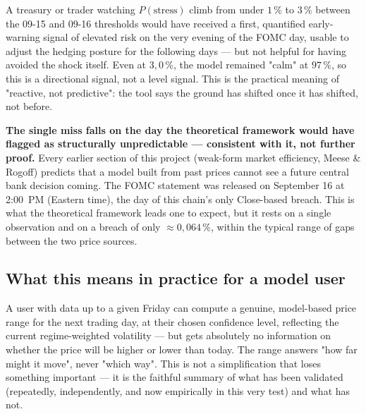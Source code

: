 \documentclass[12pt,a4paper]{article}
\begin{document}
\begin{econbox}
	
	A treasury or trader watching
	$P(\text{stress})$ climb from under $1\,\%$ to $3\,\%$ between the
	09-15 and 09-16 thresholds would have received a first, quantified
	early-warning signal of elevated risk on the very evening of
	the FOMC day, usable to adjust the hedging posture for the
	following days --- but not helpful for having avoided the
	shock itself. Even at $3{,}0\,\%$, the model remained
	"calm" at $97\,\%$, so this is a directional signal,
	not a level signal. This is the practical meaning of
	"reactive, not predictive": the tool says the ground has
	shifted once it has shifted, not before.
	
	\textbf{The single miss falls on the day the theoretical
		framework would have flagged as structurally unpredictable ---
		consistent with it, not further proof.} Every earlier
	section of this project (weak-form market efficiency,
	Meese \& Rogoff) predicts that a model built from past prices
	cannot see a future central bank decision coming. The
	FOMC statement was released on September 16 at 2:00~PM
	(Eastern time), the day of this chain's only Close-based
	breach. This is what the theoretical framework leads one to expect, but
	it rests on a single observation and on a breach of only
	$\approx 0{,}064\,\%$, within the typical range of gaps between the
	two price sources.
\end{econbox}

\subsection{What this means in practice for a model user}

\begin{econbox}
	A user with data up to a given Friday can compute a genuine,
	model-based price range for the next trading day, at their
	chosen confidence level, reflecting the current
	regime-weighted volatility --- but gets absolutely no
	information on whether the price will be higher or lower
	than today. The range answers "how far might it move",
	never "which way". This is not a simplification that loses
	something important --- it is the faithful summary of what has been
	validated (repeatedly, independently, and now empirically
	in this very test) and what has not.
\end{econbox}

\newpage
\end{document}
